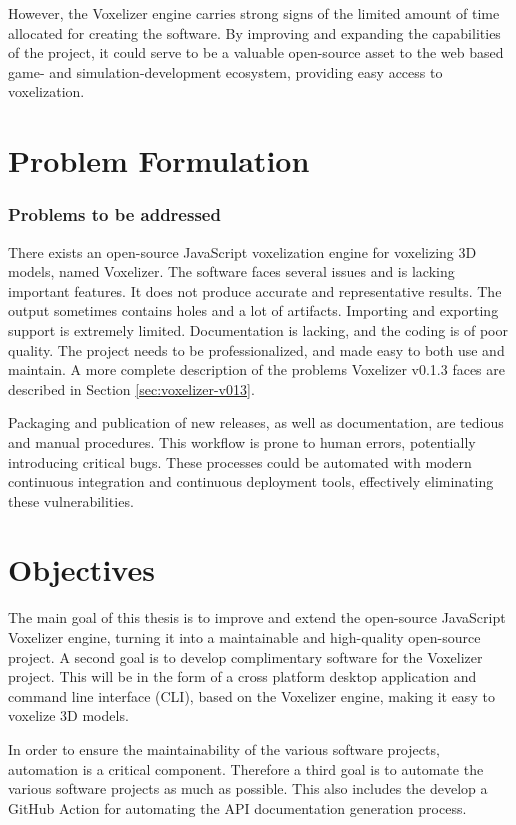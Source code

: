 However, the Voxelizer engine carries strong signs of the limited amount of time allocated for creating the software. By improving and expanding the capabilities of the project, it could serve to be a valuable open-source asset to the web based game- and simulation-development ecosystem, providing easy access to voxelization.

\section{Problem Formulation}

\subsubsection{Problems to be addressed}
There exists an open-source JavaScript voxelization engine for voxelizing 3D models, named Voxelizer. The software faces several issues and is lacking important features. It does not produce accurate and representative results. The output sometimes contains holes and a lot of artifacts. Importing and exporting support is extremely limited. Documentation is lacking, and the coding is of poor quality. The project needs to be professionalized, and made easy to both use and maintain. A more complete description of the problems Voxelizer v0.1.3 faces are described in Section \ref{sec:voxelizer-v013}.

Packaging and publication of new releases, as well as documentation, are tedious and manual procedures. This workflow is prone to human errors, potentially introducing critical bugs. These processes could be automated with modern continuous integration and continuous deployment tools, effectively eliminating these vulnerabilities.

\section{Objectives}
The main goal of this thesis is to improve and extend the open-source JavaScript Voxelizer engine, turning it into a maintainable and high-quality open-source project. A second goal is to develop complimentary software for the Voxelizer project. This will be in the form of a cross platform desktop application and command line interface (CLI), based on the Voxelizer engine, making it easy to voxelize 3D models.

In order to ensure the maintainability of the various software projects, automation is a critical component. Therefore a third goal is to automate the various software projects as much as possible. This also includes the develop a GitHub Action for automating the API documentation generation process.

